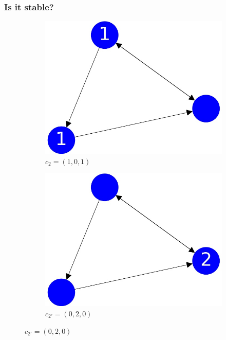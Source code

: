 \documentclass{beamer}
\begin{document}
\begin{frame}
\frametitle{Is it stable?}


\begin{figure}[h!]
  \centering
  \begin{subfigure}[b]{0.4\linewidth}
    \includegraphics[width=\linewidth]{sandpile_simple_2}
    \caption{$c_2 = (1,0,1)$}
  \end{subfigure}
  \begin{subfigure}[b]{0.4\linewidth}
    \includegraphics[width=\linewidth]{sandpile_simple_2p}
    \caption{$c_{2'} = (0,2,0)$}
  \end{subfigure}
\end{figure}


\end{frame}
\end{document}
